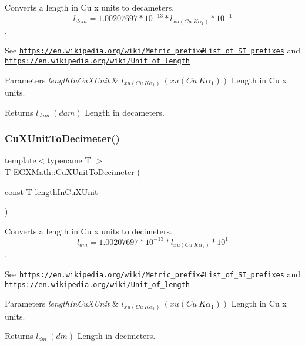 Converts a length in Cu x units to decameters. \[ l_{dam}=1.00207697*10^{-13} * l_{xu(Cu\ K\alpha_1)} * 10^{-1} \]. 

See \href{https://en.wikipedia.org/wiki/Metric_prefix#List_of_SI_prefixes}{\tt https\+://en.\+wikipedia.\+org/wiki/\+Metric\+\_\+prefix\#\+List\+\_\+of\+\_\+\+S\+I\+\_\+prefixes} and \href{https://en.wikipedia.org/wiki/Unit_of_length}{\tt https\+://en.\+wikipedia.\+org/wiki/\+Unit\+\_\+of\+\_\+length} 
\begin{DoxyParams}{Parameters}
{\em length\+In\+Cu\+X\+Unit} & $ l_{xu(Cu\ K\alpha_1)}\ (xu(Cu\ K\alpha_1))$ Length in Cu x units. \\
\hline
\end{DoxyParams}
\begin{DoxyReturn}{Returns}
$ l_{dam}\ (dam)$ Length in decameters. 
\end{DoxyReturn}
\mbox{\label{group___e_g_x_math-_conversions-_length_conversions-_non-_s_i-_cu_x_unit-_s_i_gaef88f4d943df6afdb7eec812534dead9}} 
\subsubsection{\texorpdfstring{Cu\+X\+Unit\+To\+Decimeter()}{CuXUnitToDecimeter()}}
{\footnotesize\ttfamily template$<$typename T $>$ \\
T E\+G\+X\+Math\+::\+Cu\+X\+Unit\+To\+Decimeter (\begin{DoxyParamCaption}\item[{const T}]{length\+In\+Cu\+X\+Unit }\end{DoxyParamCaption})}



Converts a length in Cu x units to decimeters. \[ l_{dm}=1.00207697*10^{-13} * l_{xu(Cu\ K\alpha_1)} * 10^{1} \]. 

See \href{https://en.wikipedia.org/wiki/Metric_prefix#List_of_SI_prefixes}{\tt https\+://en.\+wikipedia.\+org/wiki/\+Metric\+\_\+prefix\#\+List\+\_\+of\+\_\+\+S\+I\+\_\+prefixes} and \href{https://en.wikipedia.org/wiki/Unit_of_length}{\tt https\+://en.\+wikipedia.\+org/wiki/\+Unit\+\_\+of\+\_\+length} 
\begin{DoxyParams}{Parameters}
{\em length\+In\+Cu\+X\+Unit} & $ l_{xu(Cu\ K\alpha_1)}\ (xu(Cu\ K\alpha_1))$ Length in Cu x units. \\
\hline
\end{DoxyParams}
\begin{DoxyReturn}{Returns}
$ l_{dm}\ (dm)$ Length in decimeters. 
\end{DoxyReturn}
\mbox{\label{group___e_g_x_math-_conversions-_length_conversions-_non-_s_i-_cu_x_unit-_s_i_ga316cae582cd83563ed7235488958606d}} 
